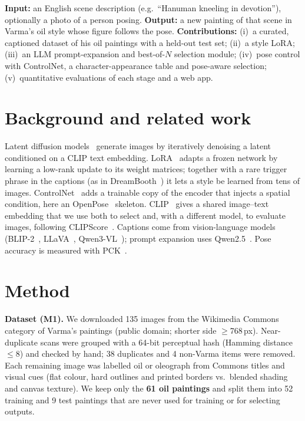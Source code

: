 \documentclass[11pt,a4paper,twocolumn]{article}
\begin{document}
\textbf{Input:} an English scene description (e.g.\ ``Hanuman kneeling in devotion''), optionally a photo
of a person posing. \textbf{Output:} a new painting of that scene in Varma's oil style whose figure follows
the pose. \textbf{Contributions:} (i)~a curated, captioned dataset of his oil paintings with a held-out test
set; (ii)~a style LoRA; (iii)~an LLM prompt-expansion and best-of-$N$ selection module; (iv)~pose control with
ControlNet, a character-appearance table and pose-aware selection; (v)~quantitative evaluations of each stage
and a web app.

\section{Background and related work}
Latent diffusion models~\cite{ho2020ddpm,rombach2022ldm} generate images by iteratively denoising a latent
conditioned on a CLIP text embedding. LoRA~\cite{hu2022lora} adapts a frozen network by learning a low-rank
update to its weight matrices; together with a rare trigger phrase in the captions (as in
DreamBooth~\cite{ruiz2023dreambooth}) it lets a style be learned from tens of images. ControlNet~\cite{zhang2023controlnet}
adds a trainable copy of the encoder that injects a spatial condition, here an OpenPose~\cite{cao2021openpose}
skeleton. CLIP~\cite{radford2021clip} gives a shared image--text embedding that we use both to select and,
with a different model, to evaluate images, following CLIPScore~\cite{hessel2021clipscore}. Captions come from
vision-language models (BLIP-2~\cite{li2023blip2}, LLaVA~\cite{liu2023llava}, Qwen3-VL~\cite{qwen3vl}); prompt
expansion uses Qwen2.5~\cite{qwen25}. Pose accuracy is measured with PCK~\cite{yang2013pck}.

\section{Method}
\textbf{Dataset (M1).} We downloaded 135 images from the Wikimedia Commons category of Varma's paintings
(public domain; shorter side $\geq$768\,px). Near-duplicate scans were grouped with a 64-bit perceptual hash
(Hamming distance $\leq 8$) and checked by hand; 38 duplicates and 4 non-Varma items were removed. Each
remaining image was labelled oil or oleograph from Commons titles and visual cues (flat colour, hard outlines
and printed borders vs.\ blended shading and canvas texture). We keep only the \textbf{61 oil paintings} and
split them into 52 training and 9 test paintings that are never used for training or for selecting outputs.
\end{document}
